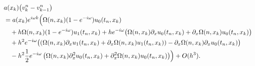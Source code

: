 \begin{align}\label{eq:wkb:adiff}
\begin{split}
&a(x_k) \bigl( v^n_k - v^n_{k-1} \bigr)\\
&=
a(x_k) e^{i \omega k} \Bigl( \Omega(n,x_k) (1-e^{-i\omega}) u_0(t_n, x_k)\\
&\quad + h \Omega(n,x_k) (1 - e^{-i \omega}) u_1(t_n, x_k) + h e^{-i \omega} \bigl( \Omega(n,x_k) \partial_x u_0(t_n, x_k) + \partial_x \Omega(n,x_k)  u_0(t_n, x_k) \bigr)\\
&\quad + h^2 e^{-i\omega}  \bigl( \left( \Omega(n,x_k) \partial_x u_1(t_n, x_k) + \partial_x \Omega(n,x_k) u_1(t_n,x_k) \right) - \partial_x \Omega(n,x_k) \partial_x u_0(t_n, x_k) \bigr)\\
&\quad - h^2 \frac{1}{2} e^{-i\omega} \left( \Omega(n,x_k) \partial^2_x u_0(t_n, x_k) + \partial^2_x \Omega(n, x_k) u_0(t_n, x_k) \right)   \Bigr) + O(h^3).
\end{split}
\end{align}


